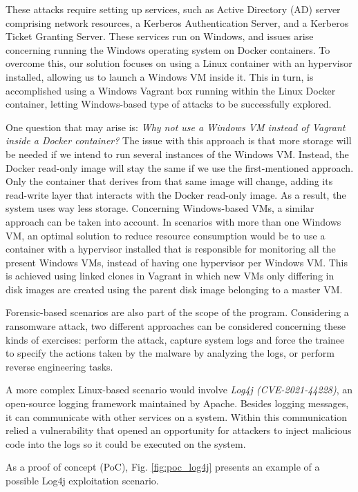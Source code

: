 These attacks require setting up services, such as Active Directory (AD) server comprising network resources, a Kerberos Authentication Server, and a Kerberos Ticket Granting Server. These services run on Windows, and issues arise concerning running the Windows operating system on Docker containers. To overcome this, our solution focuses on using a Linux container with an hypervisor installed, allowing us to launch a Windows VM inside it. This in turn, is accomplished using a Windows Vagrant box running within the Linux Docker container, letting Windows-based type of attacks to be successfully explored.

One question that may arise is: \textit{Why not use a Windows VM instead of Vagrant inside a Docker container?} The issue with this approach is that more storage will be needed if we intend to run several instances of the Windows VM. Instead, the Docker read-only image will stay the same if we use the first-mentioned approach. Only the container that derives from that same image will change, adding its read-write layer that interacts with the Docker read-only image. As a result, the system uses way less storage. Concerning Windows-based VMs, a similar approach can be taken into account. In scenarios with more than one Windows VM, an optimal solution to reduce resource consumption would be to use a container with a hypervisor installed that is responsible for monitoring all the present Windows VMs, instead of having one hypervisor per Windows VM. This is achieved using linked clones in Vagrant in which new VMs only differing in disk images are created using the parent disk image belonging to a master VM.  

Forensic-based scenarios are also part of the scope of the program. Considering a ransomware attack, two different approaches can be considered concerning these kinds of exercises: perform the attack, capture system logs and force the trainee to specify the actions taken by the malware by analyzing the logs, or perform reverse engineering tasks.

A more complex Linux-based scenario would involve \textit{Log4j (CVE-2021-44228)}, an open-source logging framework maintained by Apache. Besides logging messages, it can communicate with other services on a system. Within this communication relied a vulnerability that opened an opportunity for attackers to inject malicious code into the logs so it could be executed on the system.

As a proof of concept (PoC), Fig. \ref{fig:poc_log4j} presents an example of a possible Log4j exploitation scenario.


